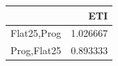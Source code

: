 \begin{tabular}{lr}
\toprule
 & ETI \\
\midrule
Flat25,Prog & 1.026667 \\
Prog,Flat25 & 0.893333 \\
\bottomrule
\end{tabular}
